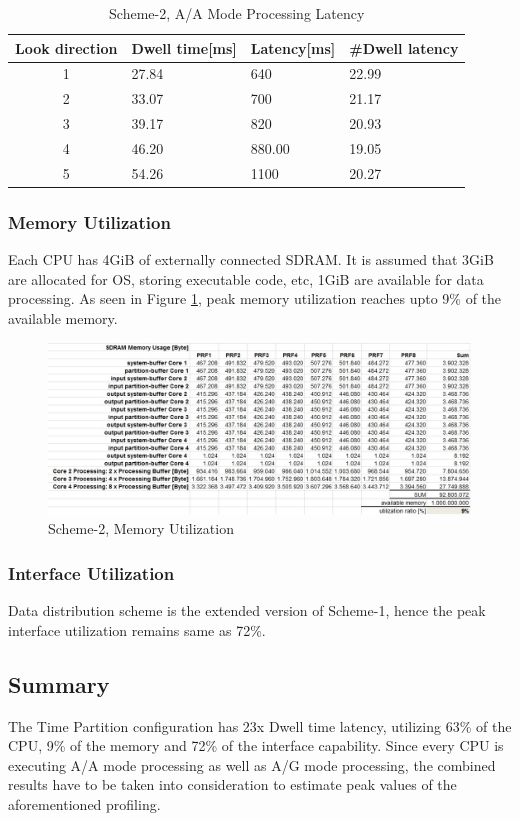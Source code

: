 \begin{table}[h!]
	\centering
	\begin{tabular}{|c|l|l|l|} 
	 \hline
	 \textbf{Look direction} & \textbf{Dwell time[ms]} & \textbf{Latency[ms]} & \textbf{\#Dwell latency} \\
	 \hline
	 1 & 27.84 & 640 & 22.99 \\ \hline
	 2 & 33.07 & 700 & 21.17 \\ \hline
	 3 & 39.17 & 820 & 20.93 \\ \hline
	 4 & 46.20 & 880.00 & 19.05 \\ \hline
	 5 & 54.26 & 1100 & 20.27 \\ \hline
	\end{tabular}
	\caption{Scheme-2, A/A Mode Processing Latency}
	\label{tbl:existing_analysis:aa_scheme2_latency}
\end{table}

\subsubsection{Memory Utilization}
\label{sss:scheme2:mem_util}
Each CPU has 4GiB of externally connected SDRAM. It is assumed that 3GiB are allocated for OS, storing executable code, etc, 1GiB are available for data processing. As seen in Figure \ref{fig:existing_analysis:scheme2_aa_mem_util}, peak memory utilization reaches upto 9\% of the available memory.

\begin{figure}[h!]
	\centering
	\includegraphics[width=160mm]{figures/scheme2_aa_mem_util}
	\caption{Scheme-2, Memory Utilization}
	\label{fig:existing_analysis:scheme2_aa_mem_util}
\end{figure}

\subsubsection{Interface Utilization}
\label{sss:scheme2:interface_util}
Data distribution scheme is the extended version of Scheme-1, hence the peak interface utilization remains same as 72\%.

\subsection{Summary}
\label{sss:scheme2:sar_summary}
The Time Partition configuration has 23x Dwell time latency, utilizing 63\% of the CPU, 9\% of the memory and 72\% of the interface capability. Since every CPU is executing A/A mode processing as well as A/G mode processing, the combined results have to be taken into consideration to estimate peak values of the aforementioned profiling.

